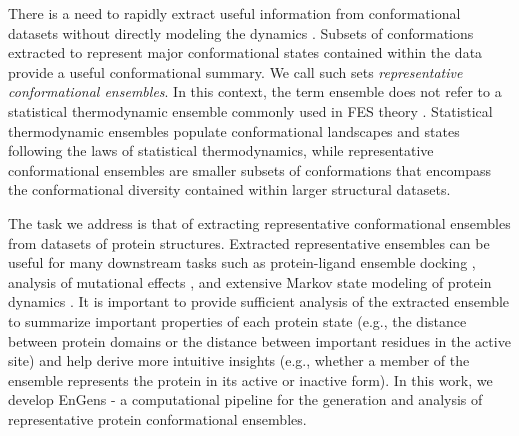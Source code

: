 \documentclass[unnumsec,webpdf,contemporary,large,numsquare]{oup-authoring-template}%
\theoremstyle{thmstyleone}%
\theoremstyle{thmstyletwo}%
\theoremstyle{thmstylethree}%
\begin{document}
There is a need to rapidly extract useful information from conformational datasets without directly modeling the dynamics \citep{peng_clustering_2018}. Subsets of conformations extracted to represent major conformational states contained within the data provide a useful conformational summary. We call such sets \textit{representative conformational ensembles}. In this context, the term ensemble does not refer to a statistical thermodynamic ensemble commonly used in FES theory \citep{hilser_statistical_2006}. Statistical thermodynamic ensembles populate conformational landscapes and states following the laws of statistical thermodynamics, while representative conformational ensembles are smaller subsets of conformations that encompass the conformational diversity contained within larger structural datasets.

The task we address is that of extracting representative conformational ensembles from datasets of protein structures. Extracted representative ensembles can be useful for many downstream tasks such as protein-ligand ensemble docking \citep{hall-swan_dinc-covid_2021}, analysis of mutational effects \citep{kannan_ensemble_2022}, and extensive Markov state modeling of protein dynamics \citep{abella_markov_2020, chan_markov_2021}. It is important to provide sufficient analysis of the extracted ensemble to summarize important properties of each protein state (e.g., the distance between protein domains or the distance between important residues in the active site) and help derive more intuitive insights (e.g., whether a member of the ensemble represents the protein in its active or inactive form). In this work, we develop EnGens - a computational pipeline for the generation and analysis of representative protein conformational ensembles.
\end{document}
